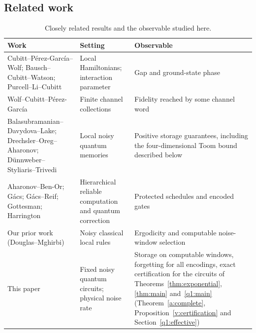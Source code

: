 \subsection{Related work}\label{intro:related}
\begin{table}[!tb]
\caption{Closely related results and the observable studied here.}
\label{tab:landscape}
\small\centering
\begin{tabular}{@{}>{\raggedright\arraybackslash}p{}>{\raggedright\arraybackslash}p{}>{\raggedright\arraybackslash}p{}@{}}
\toprule
Work & Setting & Observable\\
\midrule
Cubitt--P\'erez-Garc\'ia--Wolf; Bausch--Cubitt--Watson; Purcell--Li--Cubitt \cite{BCW2021,CPGW2015,PLC2024}
 & Local Hamiltonians; interaction parameter & Gap and ground-state phase\\\addlinespace[3pt]
Wolf--Cubitt--P\'erez-Garc\'ia~\cite{WCPG2011} & Finite channel collections & Fidelity reached by some channel word\\\addlinespace[3pt]
Balasubramanian--Davydova--Lake; Drechsler--Oreg--Aharonov; D\"unnweber--Styliaris--Trivedi~\cite{BDL2026,DOA2026,DST2026}
 & Local noisy quantum memories & Positive storage guarantees, including the four-dimensional Toom bound described below\\\addlinespace[3pt]
Aharonov--Ben-Or; G\'acs; G\'acs--Reif; Gottesman; Harrington~\cite{ABO2008,Gacs1986,Gacs2001,GacsReif1988,Gottesman2000,Harrington2004}
 & Hierarchical reliable computation and quantum correction & Protected schedules and encoded gates\\\addlinespace[3pt]
Our prior work (Douglas--Mghirbi)~\cite{DMFixed2026,DMNoise1D2026,DMNoise2026,DMPhase2026} & Noisy classical local rules & Ergodicity and computable noise-window selection\\\addlinespace[3pt]
This paper & Fixed noisy quantum circuits; physical noise rate & Storage on computable windows, forgetting for all encodings, exact certification for the circuits of Theorems~\ref{thm:exponential}, \ref{thm:main} and~\ref{q1:main} (Theorem~\ref{a:complete}, Proposition~\ref{v:certification} and Section~\ref{q1:effective})\\
\bottomrule
\end{tabular}
\end{table}

